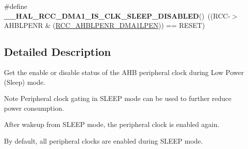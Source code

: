 \begin{DoxyCompactItemize}
\item 
\hypertarget{group___r_c_c___a_h_b___clock___sleep___enable___disable___status_gac5b14fe76c4661619636fcdf08e2a874}{\#define {\bfseries \-\_\-\-\_\-\-H\-A\-L\-\_\-\-R\-C\-C\-\_\-\-D\-M\-A1\-\_\-\-I\-S\-\_\-\-C\-L\-K\-\_\-\-S\-L\-E\-E\-P\-\_\-\-D\-I\-S\-A\-B\-L\-E\-D}()~((R\-C\-C-\/$>$A\-H\-B\-L\-P\-E\-N\-R \& (\hyperlink{group___peripheral___registers___bits___definition_ga8053aa13396d01a92ab6668dc18024b1}{R\-C\-C\-\_\-\-A\-H\-B\-L\-P\-E\-N\-R\-\_\-\-D\-M\-A1\-L\-P\-E\-N})) == R\-E\-S\-E\-T)}\label{group___r_c_c___a_h_b___clock___sleep___enable___disable___status_gac5b14fe76c4661619636fcdf08e2a874}

\end{DoxyCompactItemize}


\subsection{Detailed Description}
Get the enable or disable status of the A\-H\-B peripheral clock during Low Power (Sleep) mode. \begin{DoxyNote}{Note}
Peripheral clock gating in S\-L\-E\-E\-P mode can be used to further reduce power consumption. 

After wakeup from S\-L\-E\-E\-P mode, the peripheral clock is enabled again. 

By default, all peripheral clocks are enabled during S\-L\-E\-E\-P mode. 
\end{DoxyNote}
